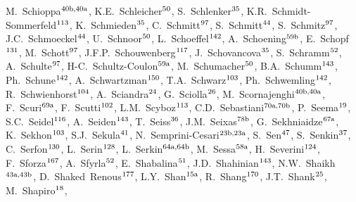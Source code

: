 \begin{flushleft}
M.~Schioppa$^\textrm{\scriptsize 40b,40a}$,    
K.E.~Schleicher$^\textrm{\scriptsize 50}$,    
S.~Schlenker$^\textrm{\scriptsize 35}$,    
K.R.~Schmidt-Sommerfeld$^\textrm{\scriptsize 113}$,    
K.~Schmieden$^\textrm{\scriptsize 35}$,    
C.~Schmitt$^\textrm{\scriptsize 97}$,    
S.~Schmitt$^\textrm{\scriptsize 44}$,    
S.~Schmitz$^\textrm{\scriptsize 97}$,    
J.C.~Schmoeckel$^\textrm{\scriptsize 44}$,    
U.~Schnoor$^\textrm{\scriptsize 50}$,    
L.~Schoeffel$^\textrm{\scriptsize 142}$,    
A.~Schoening$^\textrm{\scriptsize 59b}$,    
E.~Schopf$^\textrm{\scriptsize 131}$,    
M.~Schott$^\textrm{\scriptsize 97}$,    
J.F.P.~Schouwenberg$^\textrm{\scriptsize 117}$,    
J.~Schovancova$^\textrm{\scriptsize 35}$,    
S.~Schramm$^\textrm{\scriptsize 52}$,    
A.~Schulte$^\textrm{\scriptsize 97}$,    
H-C.~Schultz-Coulon$^\textrm{\scriptsize 59a}$,    
M.~Schumacher$^\textrm{\scriptsize 50}$,    
B.A.~Schumm$^\textrm{\scriptsize 143}$,    
Ph.~Schune$^\textrm{\scriptsize 142}$,    
A.~Schwartzman$^\textrm{\scriptsize 150}$,    
T.A.~Schwarz$^\textrm{\scriptsize 103}$,    
Ph.~Schwemling$^\textrm{\scriptsize 142}$,    
R.~Schwienhorst$^\textrm{\scriptsize 104}$,    
A.~Sciandra$^\textrm{\scriptsize 24}$,    
G.~Sciolla$^\textrm{\scriptsize 26}$,    
M.~Scornajenghi$^\textrm{\scriptsize 40b,40a}$,    
F.~Scuri$^\textrm{\scriptsize 69a}$,    
F.~Scutti$^\textrm{\scriptsize 102}$,    
L.M.~Scyboz$^\textrm{\scriptsize 113}$,    
C.D.~Sebastiani$^\textrm{\scriptsize 70a,70b}$,    
P.~Seema$^\textrm{\scriptsize 19}$,    
S.C.~Seidel$^\textrm{\scriptsize 116}$,    
A.~Seiden$^\textrm{\scriptsize 143}$,    
T.~Seiss$^\textrm{\scriptsize 36}$,    
J.M.~Seixas$^\textrm{\scriptsize 78b}$,    
G.~Sekhniaidze$^\textrm{\scriptsize 67a}$,    
K.~Sekhon$^\textrm{\scriptsize 103}$,    
S.J.~Sekula$^\textrm{\scriptsize 41}$,    
N.~Semprini-Cesari$^\textrm{\scriptsize 23b,23a}$,    
S.~Sen$^\textrm{\scriptsize 47}$,    
S.~Senkin$^\textrm{\scriptsize 37}$,    
C.~Serfon$^\textrm{\scriptsize 130}$,    
L.~Serin$^\textrm{\scriptsize 128}$,    
L.~Serkin$^\textrm{\scriptsize 64a,64b}$,    
M.~Sessa$^\textrm{\scriptsize 58a}$,    
H.~Severini$^\textrm{\scriptsize 124}$,    
F.~Sforza$^\textrm{\scriptsize 167}$,    
A.~Sfyrla$^\textrm{\scriptsize 52}$,    
E.~Shabalina$^\textrm{\scriptsize 51}$,    
J.D.~Shahinian$^\textrm{\scriptsize 143}$,    
N.W.~Shaikh$^\textrm{\scriptsize 43a,43b}$,    
D.~Shaked~Renous$^\textrm{\scriptsize 177}$,    
L.Y.~Shan$^\textrm{\scriptsize 15a}$,    
R.~Shang$^\textrm{\scriptsize 170}$,    
J.T.~Shank$^\textrm{\scriptsize 25}$,    
M.~Shapiro$^\textrm{\scriptsize 18}$,    

\end{flushleft}
